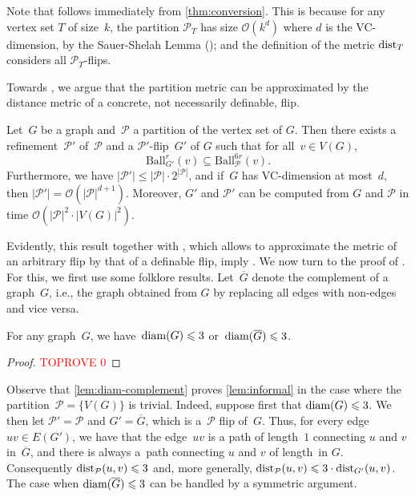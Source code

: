 \documentclass[a4paper,UKenglish,cleveref, autoref, thm-restate]{lipics-v2021}
\newcommand{\Oof}{{\cal O}}
\renewcommand{\cal}{\mathcal}
\newcommand{\dist}{\textnormal{dist}}
\newcommand{\diam}{\textnormal{diam}}
\newcommand{\PP}{\mathcal{P}}
\renewcommand{\le}{\leqslant}
\renewcommand{\leq}{\le}
\newcommand{\Ball}{\mathrm{Ball}}
\newcommand{\Oh}{\mathcal{O}}
\begin{document}
Note that  follows immediately from \cref{thm:conversion}. This is because for any vertex set $T$ of size~$k$, the partition $\PP_T$ has size $\Oh(k^d)$ where $d$ is the VC-dimension, by the Sauer-Shelah Lemma (); and the definition of the metric $\dist_T$ considers all $\PP_T$-flips.










Towards , we argue that the partition metric can be approximated by the distance metric of a concrete, not necessarily definable, flip. 

\begin{lemma}
  Let~$G$ be a graph and~$\PP$ a partition of the vertex set of $G$.
  Then there exists a refinement~$\PP'$ of~$\PP$ and a $\PP'$-flip~$G'$ of $G$ such that for all~$v \in V(G)$,
  \[ \Ball^r_{G'}(v) \subseteq \Ball^{6r}_\PP(v). \]
  Furthermore, we have  $|\PP'| \le |\PP| \cdot2^{|\PP|}$, and if~$G$ has VC-dimension at most~$d$, then $|\PP'| = \Oof(|\PP|^{d+1})$.
  Moreover, $G'$ and $\PP'$ can be computed from $G$ and $\PP$ in time $\cal{O}(|\PP|^2\cdot |V(G)|^2)$.
  \label{lem:informal}
\end{lemma}

Evidently, this result together with , which allows to approximate the metric of an arbitrary flip by that of a definable flip, imply . We now turn to the proof of . For this, we first use some folklore results.
Let~$\overline{G}$ denote the complement of a graph~$G$, i.e., the graph obtained from $G$ by replacing all edges with non-edges and vice versa.
\begin{lemma}
  \label{lem:diam-complement}
  For any graph~$G$, we have~$\diam(G) \le \diamBound$ or~$\diam(\overline{G}) \le \diamBound$.
\end{lemma}
\begin{proof}\textcolor{red}{TOPROVE 0}\end{proof}
Observe that \cref{lem:diam-complement} proves \cref{lem:informal} in the case where the partition~$\PP = \{V(G)\}$ is trivial. Indeed, suppose first that $\diam(G)\leq \diamBound$. We then let $\PP'=\PP$ and $G'=\overline{G}$, which is a~$\PP$ flip of~$G$. Thus, for every edge~$uv \in E(G')$, we have that
the edge~$uv$ is a path of length~$1$ connecting $u$ and $v$ in~$\overline{G}$, and there is always a~path connecting $u$ and $v$ of length~\diamBound in $G$. Consequently $\dist_{\PP}(u,v)\leq \diamBound$ and, more generally, $\dist_{\PP}(u,v) \leq \diamBound \cdot \dist_{G'}(u,v)$. The case when $\diam(\overline{G})\leq \diamBound$ can be handled by a symmetric argument.
\end{document}
